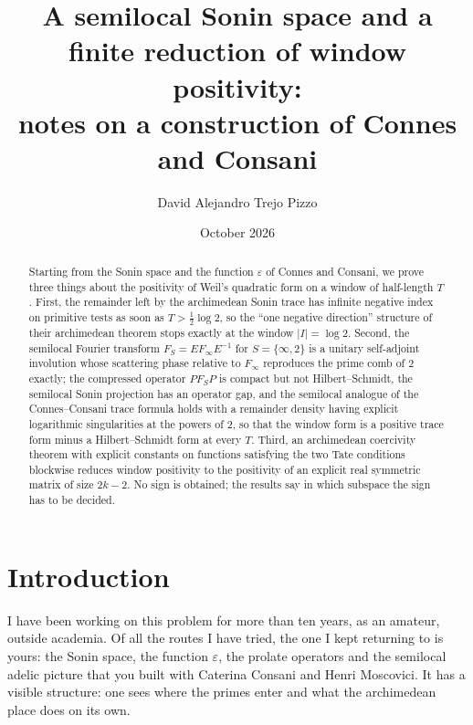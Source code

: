 \documentclass[11pt]{amsart}
\theoremstyle{definition}
\theoremstyle{remark}
\begin{document}
\title[A semilocal Sonin space and a finite reduction]{A semilocal Sonin space and a finite reduction of window positivity:\\ notes on a construction of Connes and Consani}
\author{David Alejandro Trejo Pizzo}
\address{Independent researcher, Buenos Aires}
\date{October 2026}

\begin{abstract}
Starting from the Sonin space and the function $\varepsilon$ of Connes and Consani, we prove three
things about the positivity of Weil's quadratic form on a window of half-length $T$. First, the
remainder left by the archimedean Sonin trace has infinite negative index on primitive tests as soon as
$T>\frac12\log2$, so the ``one negative direction'' structure of their archimedean theorem stops exactly
at the window $|I|=\log2$. Second, the semilocal Fourier transform $F_S=EF_\infty E^{-1}$ for $S=\{\infty,2\}$ is a
unitary self-adjoint involution whose scattering phase relative to $F_\infty$ reproduces the prime comb
of $2$ exactly; the compressed operator $PF_SP$ is compact but not Hilbert--Schmidt, the semilocal Sonin
projection has an operator gap, and the semilocal analogue of the Connes--Consani trace formula holds with
a remainder density having explicit logarithmic singularities at the powers of $2$, so that the window
form is a positive trace form minus a Hilbert--Schmidt form at every $T$. Third, an archimedean coercivity
theorem with explicit constants on functions satisfying the two Tate conditions blockwise reduces window
positivity to the positivity of an explicit real symmetric matrix of size $2k-2$. No sign is obtained; the results say in which subspace the sign has to be decided.
\end{abstract}

\maketitle

\section{Introduction}

I have been working on this problem for more than ten years, as an amateur, outside academia. Of all the
routes I have tried, the one I kept returning to is yours: the Sonin space, the function $\varepsilon$, the
prolate operators and the semilocal adelic picture that you built with Caterina Consani and Henri
Moscovici. It has a visible structure: one sees where the primes enter and what the archimedean place does on its own.
\end{document}
